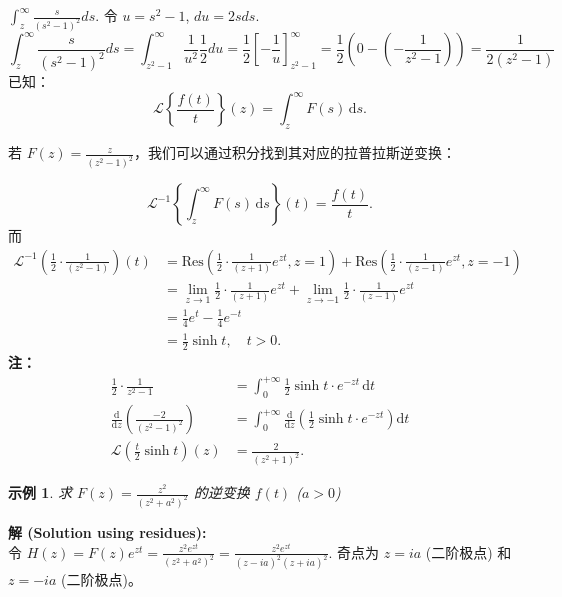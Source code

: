 \documentclass[linespread=1.5,openany]{book}%
\def\diff{d}%
\theoremstyle{plain}
\newtheorem{example}[theorem]{示例}
\newcommand{\diff}{\mathop{}\!\mathrm{d}}  %
\begin{document}
{{{{{{{									$\int_z^\infty \frac{s}{(s^2-1)^2} \diff s$. 令 $u=s^2-1$, $\diff u = 2s \diff s$.
									\[\int_z^\infty \frac{s}{(s^2-1)^2} \diff s= \int_{z^2-1}^\infty \frac{1}{u^2} \frac{1}{2} \diff u = \frac{1}{2} \left[ -\frac{1}{u} \right]_{z^2-1}^\infty = \frac{1}{2} \left( 0 - \left(-\frac{1}{z^2-1}\right) \right) = \frac{1}{2(z^2-1)} \]
									已知：
									\[
									\mathcal{L}\left\{\frac{f(t)}{t}\right\}(z) = \int_z^\infty F(s) \, \mathrm{d}s.
									\]
									
									若 \( F(z) = \frac{z}{(z^2 - 1)^2} \)，我们可以通过积分找到其对应的拉普拉斯逆变换：
									
									\[
									\mathcal{L}^{-1}\left\{\int_z^\infty F(s) \, \mathrm{d}s\right\}(t) = \frac{f(t)}{t}.
									\]
									而
									\begin{align*}
										\mathcal{L}^{-1}\left(\frac{1}{2} \cdot \frac{1}{(z^2 - 1)}\right)(t) &= \text{Res}\left(\frac{1}{2} \cdot \frac{1}{(z+1)} e^{zt}, z=1\right) + \text{Res}\left(\frac{1}{2} \cdot \frac{1}{(z-1)} e^{zt}, z=-1\right) \\
										&= \lim_{z \to 1} \frac{1}{2} \cdot \frac{1}{(z+1)} e^{zt} + \lim_{z \to -1} \frac{1}{2} \cdot \frac{1}{(z-1)} e^{zt} \\
										&= \frac{1}{4} e^{t} - \frac{1}{4} e^{-t} \\
										&= \frac{1}{2} \sinh t, \quad t > 0.
									\end{align*}
									\textbf{注：}
									\begin{align*}
										\frac{1}{2} \cdot \frac{1}{z^2 - 1} &= \int_{0}^{+\infty} \frac{1}{2} \sinh t \cdot e^{-zt} \, \mathrm{d}t \\[6pt]
										\frac{\mathrm{d}}{\mathrm{d}z} \left( \frac{-2}{(z^2 - 1)^2} \right) &= \int_{0}^{+\infty} \frac{\mathrm{d}}{\mathrm{d}z} \left( \frac{1}{2} \sinh t \cdot e^{-zt} \right) \mathrm{d}t \\[6pt]
										\mathcal{L}\left( \frac{t}{2} \sinh t \right)(z) &= \frac{2}{(z^2 + 1)^2}.
									\end{align*}
									
									\begin{example}求 $F(z) = \frac{z^2}{(z^2+a^2)^2}$ 的逆变换 $f(t)$ ($a>0$) \label{ex:L16_inv_laplace_ex7_spaced}
									\end{example}
									\noindent\textbf{解 (Solution using residues):} \\
									令 $H(z) = F(z)e^{zt} = \frac{z^2 e^{zt}}{(z^2+a^2)^2} = \frac{z^2 e^{zt}}{(z-ia)^2(z+ia)^2}$.
									奇点为 $z=ia$ (二阶极点) 和 $z=-ia$ (二阶极点)。
									
}}}}}}}
\end{document}
